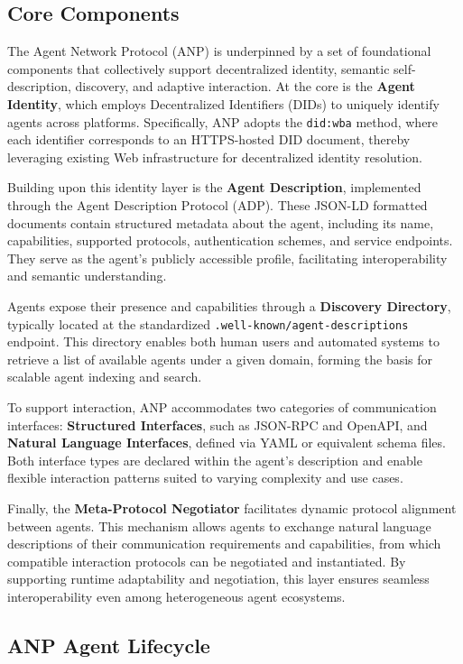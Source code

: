 \documentclass{article}
\begin{document}
\subsection{Core Components}
The Agent Network Protocol (ANP) is underpinned by a set of foundational components that collectively support decentralized identity, semantic self-description, discovery, and adaptive interaction. At the core is the \textbf{Agent Identity}, which employs Decentralized Identifiers (DIDs) to uniquely identify agents across platforms. Specifically, ANP adopts the \texttt{did:wba} method, where each identifier corresponds to an HTTPS-hosted DID document, thereby leveraging existing Web infrastructure for decentralized identity resolution.

Building upon this identity layer is the \textbf{Agent Description}, implemented through the Agent Description Protocol (ADP). These JSON-LD formatted documents contain structured metadata about the agent, including its name, capabilities, supported protocols, authentication schemes, and service endpoints. They serve as the agent’s publicly accessible profile, facilitating interoperability and semantic understanding.

Agents expose their presence and capabilities through a \textbf{Discovery Directory}, typically located at the standardized \texttt{.well-known/agent-descriptions} endpoint. This directory enables both human users and automated systems to retrieve a list of available agents under a given domain, forming the basis for scalable agent indexing and search.

To support interaction, ANP accommodates two categories of communication interfaces: \textbf{Structured Interfaces}, such as JSON-RPC and OpenAPI, and \textbf{Natural Language Interfaces}, defined via YAML or equivalent schema files. Both interface types are declared within the agent’s description and enable flexible interaction patterns suited to varying complexity and use cases.

Finally, the \textbf{Meta-Protocol Negotiator} facilitates dynamic protocol alignment between agents. This mechanism allows agents to exchange natural language descriptions of their communication requirements and capabilities, from which compatible interaction protocols can be negotiated and instantiated. By supporting runtime adaptability and negotiation, this layer ensures seamless interoperability even among heterogeneous agent ecosystems.

\subsection{ANP Agent Lifecycle}
\end{document}
